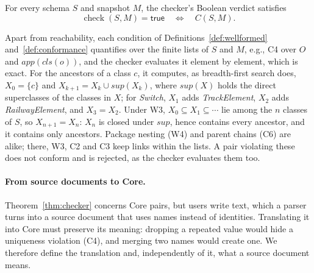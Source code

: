\begin{theorem}\label{thm:checker}
For every schema $S$ and snapshot $M$, the checker's Boolean verdict satisfies
\begin{equation}
 \operatorname{check}(S,M)=\mathsf{true}
 \quad\Longleftrightarrow\quad C(S,M).
\label{eq:checker}
\end{equation}
\end{theorem}
\begin{proofsketch}
Apart from reachability, each condition of Definitions~\ref{def:wellformed}
and~\ref{def:conformance} quantifies over the finite lists of $S$ and $M$, e.g.,
C4 over $O$ and $\mathit{app}(\mathit{cls}(o))$, and the checker evaluates it
element by element, which is exact. For the ancestors of a class $c$, it
computes, as breadth-first search does, $X_0=\{c\}$ and
$X_{k+1}=X_k\cup\mathit{sup}(X_k)$, where $\mathit{sup}(X)$ holds the direct
superclasses of the classes in $X$; for \emph{Switch}, $X_1$ adds
\emph{TrackElement}, $X_2$ adds \emph{RailwayElement}, and $X_3=X_2$. Under W3,
$X_0\subseteq X_1\subseteq\cdots$ lie among the $n$ classes of $S$, so $X_{n+1}=X_n$:
$X_n$ is closed under $\mathit{sup}$, hence contains every ancestor, and it
contains only ancestors. Package nesting (W4) and parent chains (C6) are alike;
there, W3, C2 and C3 keep links within the lists. A pair violating these does not conform and is rejected, as the
checker evaluates them too.
\end{proofsketch}

\paragraph{From source documents to Core.}
Theorem~\ref{thm:checker} concerns Core pairs, but users write text, which a
parser turns into a source document that uses names instead of identities.
Translating it into Core must preserve its meaning: dropping a repeated value
would hide a uniqueness violation (C4), and merging two names would create one.
We therefore define the translation and, independently of it, what a source
document means.

